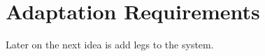 \KNEADSECTIONNEWPAGE
\section{Adaptation Requirements}
\label{lab:sec_Adaptation}


Later on the next idea is add legs to the system.